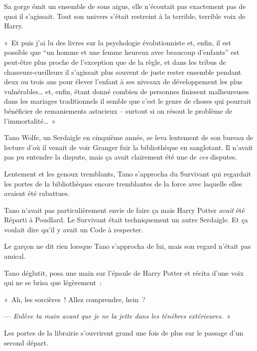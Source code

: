 Sa gorge émit un ensemble de sons aigus, elle n'écoutait pas exactement pas de quoi il s'agissait.
Tout son univers s'était restreint à la terrible, terrible voix de Harry.

«~Et puis j'ai lu des livres sur la psychologie évolutionniste et, enfin, il est possible que “un homme et une femme heureux avec beaucoup d'enfants” est peut-être plus proche de l'exception que de la règle, et dans les tribus de chasseurs-cueilleurs il s'agissait plus souvent de juste rester ensemble pendant deux ou trois ans pour élever l'enfant à ses niveaux de développement les plus vulnérables… et, enfin, étant donné combien de personnes finissent malheureuses dans les mariages traditionnels il semble que c'est le genre de choses qui pourrait bénéficier de remaniements astucieux -- surtout si on résout le problème de l'immortalité…~»

\later

Tano Wolfe, un Serdaigle en cinquième année, se leva lentement de son bureau de lecture d'où il venait de voir Granger fuir la bibliothèque en sanglotant.
Il n'avait pas pu entendre la dispute, mais ça avait clairement été une de \emph{ces} disputes.

Lentement et les genoux tremblants, Tano s'approcha du Survivant qui regardait les portes de la bibliothèques encore tremblantes de la force avec laquelle elles avaient été rabattues.

Tano n'avait pas particulièrement envie de faire ça mais Harry Potter \emph{avait} été Réparti à Poudlard.
Le Survivant était techniquement un autre Serdaigle.
Et ça voulait dire qu'il y avait un Code à respecter.

Le garçon ne dit rien lorsque Tano s'approcha de lui, mais son regard n'était pas amical.

Tano déglutit, posa une main sur l'épaule de Harry Potter et récita d'une voix qui ne se brisa que légèrement~:

«~Ah, les sorcières~!
Allez comprendre, hein~?

--- \emph{Enlève ta main avant que je ne la jette dans les ténèbres extérieures.}~»

Les portes de la librairie s'ouvrirent grand une fois de plus sur le passage d'un second départ.
